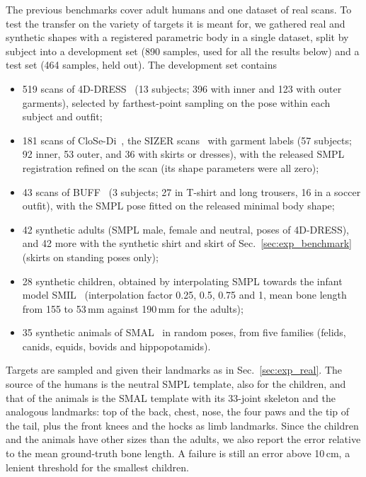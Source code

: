 \documentclass[11pt]{article}
\begin{document}
The previous benchmarks cover adult humans and one dataset of real scans. To
test the transfer on the variety of targets it is meant for, we gathered real
and synthetic shapes with a registered parametric body in a single dataset,
split by subject into a development set (890 samples, used for all the
results below) and a test set (464 samples, held out). The development set
contains
\begin{itemize}
  \item 519 scans of 4D-DRESS~\citep{wang2024dress} (13 subjects; 396 with
    inner and 123 with outer garments), selected by farthest-point sampling on
    the pose within each subject and outfit;
  \item 181 scans of CloSe-Di~\citep{antic2024close}, the SIZER
    scans~\citep{tiwari2020sizer} with garment labels (57 subjects; 92 inner,
    53 outer, and 36 with skirts or dresses), with the released SMPL
    registration refined on the scan (its shape parameters were all zero);
  \item 43 scans of BUFF~\citep{zhang2017detailed} (3 subjects; 27 in
    T-shirt and long trousers, 16 in a soccer outfit), with the SMPL
    pose fitted on the released minimal body shape;
  \item 42 synthetic adults (SMPL male, female and neutral, poses of
    4D-DRESS), and 42 more with the synthetic shirt and skirt of
    Sec.~\ref{sec:exp_benchmark} (skirts on standing poses only);
  \item 28 synthetic children, obtained by interpolating SMPL towards the
    infant model SMIL~\citep{hesse2018learning} (interpolation factor 0.25,
    0.5, 0.75 and 1, mean bone length from 155 to 53\,mm against 190\,mm for
    the adults);
  \item 35 synthetic animals of SMAL~\citep{zuffi2017menagerie} in random
    poses, from five families (felids, canids, equids, bovids and
    hippopotamids).
\end{itemize}
Targets are sampled and given their landmarks as in Sec.~\ref{sec:exp_real}.
The source of the humans is the neutral SMPL template, also for the
children, and that of the animals is the SMAL template with its 33-joint
skeleton and the analogous landmarks: top of the back, chest, nose, the four
paws and the tip of the tail, plus the front knees and the hocks as limb
landmarks. Since the children and the animals have other sizes than the
adults, we also report the error relative to the mean ground-truth bone
length. A failure is still an error above 10\,cm, a lenient threshold for the
smallest children.
\end{document}
